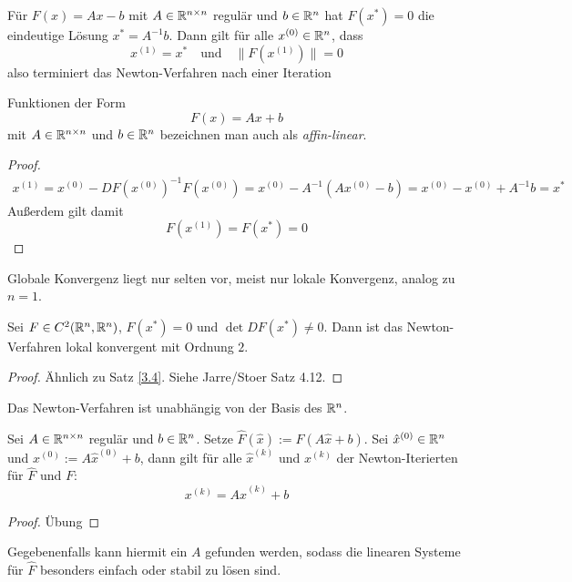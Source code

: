 \documentclass[
]{mycourse}
\begin{document}
\begin{lem} \label{3.22}
	Für $F(x) = Ax - b$ mit $A\in \mathbb{R}^{n\times n}$ regulär und $b\in \mathbb{R}^n$ hat $F(x^*)=0$ die eindeutige Lösung $x^* = A^{-1}b$.
	Dann gilt für alle $x^{(0)} \in \mathbb{R}^n$, dass
	\[
		x^{(1)} = x^*
		\quad\text{und}\quad
		\|F(x^{(1)})\| = 0
	\]
	also terminiert das Newton-Verfahren nach einer Iteration
	\begin{note}
		Funktionen der Form
		\[
			F(x) = Ax + b
		\]
		mit $A\in \mathbb{R}^{n\times n}$ und $b\in \mathbb{R}^n$ bezeichnen man auch als \emph{affin-linear}.
	\end{note}
	\begin{proof}
		\begin{align*}
			x^{(1)} = x^{(0)} - DF(x^{(0)})^{-1}F(x^{(0)}) = x^{(0)} - A^{-1} (Ax^{(0)}-b) = x^{(0)} - x^{(0)} + A^{-1}b = x^*
		\end{align*}
		Außerdem gilt damit
		\[
			F(x^{(1)}) = F(x^*) = 0
		\]
	\end{proof}
	\begin{note}
		Globale Konvergenz liegt nur selten vor, meist nur lokale Konvergenz, analog zu $n=1$.
	\end{note}
\end{lem}

\begin{st} \label{3.23}
	Sei $F \in C^2(\mathbb{R}^n, \mathbb{R}^n)$, $F(x^*) = 0$ und $\det DF(x^*) \neq 0$.
	Dann ist das Newton-Verfahren lokal konvergent mit Ordnung $2$.
	\begin{proof}
		Ähnlich zu Satz \ref{3.4}.
		Siehe Jarre/Stoer Satz 4.12.
	\end{proof}
\end{st}

Das Newton-Verfahren ist unabhängig von der Basis des $\mathbb{R}^n$.

\begin{st} \label{3.24}
	Sei $A\in \mathbb{R}^{n\times n}$ regulär und $b \in \mathbb{R}^n$.
	Setze $\hat F(\hat x) := F(A\hat x+b)$.
	Sei $\hat x^{(0)} \in \mathbb{R}^n$ und $x^{(0)} := A\hat x^{(0)} + b$, dann gilt für alle $\hat x^{(k)}$ und $x^{(k)}$ der Newton-Iterierten für $\hat F$ und $F$:
	\[
		x^{(k)} = A \hat x^{(k)} + b
	\]
	\begin{proof}
		Übung
	\end{proof}
	\begin{note}
		Gegebenenfalls kann hiermit ein $A$ gefunden werden, sodass die linearen Systeme für $\hat F$ besonders einfach oder stabil zu lösen sind.
	\end{note}
\end{st}
\end{document}
